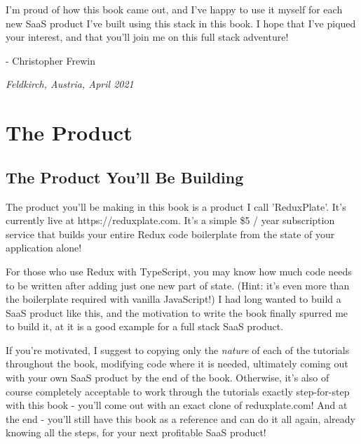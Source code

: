 \documentclass[a4paper,
                             oneside,
                             BCOR1.0cm,
                             DIV11,
                             parskip=full,
                             11pt]{scrbook}
\begin{document}

I'm proud of how this book came out, and I've happy to use it myself for each new SaaS product I've built using this stack in this book. I hope that I've piqued your interest, and that you'll join me on this full stack adventure!

- Christopher Frewin

\textit{Feldkirch, Austria, April 2021}

\chapter{The Product}\label{cap:primer}

\section{The Product You'll Be Building}\label{sec:titles}

The product you'll be making in this book is a product I call 'ReduxPlate'. It's currently live at https://reduxplate.com. It's a simple \$5 / year subscription service that builds your entire Redux code boilerplate from the state of your application alone! 

For those who use Redux with TypeScript, you may know how much code needs to be written after adding just one new part of state. (Hint: it's even more than the boilerplate required with vanilla JavaScript!) I had long wanted to build a SaaS product like this, and the motivation to write the book finally spurred me to build it, at it is a good example for a full stack SaaS product. 


If you're motivated, I suggest to copying only the \textit{nature} of each of the tutorials throughout the book, modifying code where it is needed, ultimately coming out with your own SaaS product by the end of the book. Otherwise, it's also of course completely acceptable to work through the tutorials exactly step-for-step with this book - you'll come out with an exact clone of reduxplate.com! And at the end - you'll still have this book as a reference and can do it all again, already knowing all the steps, for your next profitable SaaS product!
\end{document}
